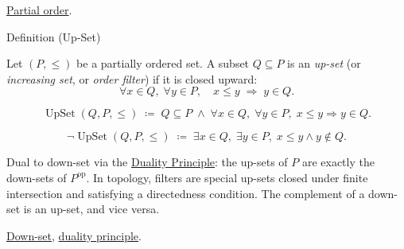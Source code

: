 \begin{remark*}[Dependencies]
\hyperref[def:lattice-order-partial-order]{Partial order}.
\end{remark*}


\begin{definitionbox}{Definition (Up-Set)}
\begin{definition}[Up-Set]
\label{def:up-set}
Let $(P, \leq)$ be a partially ordered set.  A subset $Q \subseteq P$ is
an \emph{up-set} (or \emph{increasing set}, or \emph{order filter}) if it
is closed upward:
\[
\forall x \in Q,\; \forall y \in P,\quad x \leq y \;\Longrightarrow\; y \in Q.
\]
\end{definition}
\end{definitionbox}

\begin{remark*}
\[
\operatorname{UpSet}(Q, P, \leq)
\;\coloneqq\;
Q \subseteq P
\;\land\;
\forall x \in Q,\; \forall y \in P,\;
x \leq y \Rightarrow y \in Q.
\]
\end{remark*}

\begin{remark*}
\[
\neg\operatorname{UpSet}(Q, P, \leq)
\;\coloneqq\;
\exists x \in Q,\; \exists y \in P,\;
x \leq y \land y \notin Q.
\]
\end{remark*}

\begin{remark*}[Interpretation]
Dual to down-set via the
\hyperref[prop:duality-principle]{Duality Principle}: the up-sets of $P$
are exactly the down-sets of $P^{\mathrm{op}}$.  In topology, filters are
special up-sets closed under finite intersection and satisfying a
directedness condition.  The complement of a down-set is an up-set, and
vice versa.
\end{remark*}

\begin{remark*}[Dependencies]
\hyperref[def:down-set]{Down-set},
\hyperref[prop:duality-principle]{duality principle}.
\end{remark*}
